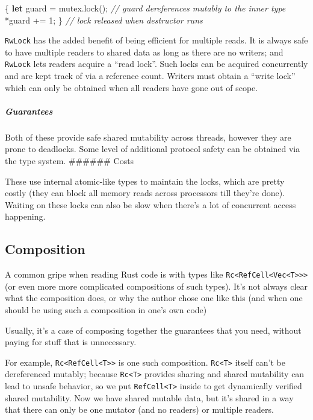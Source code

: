 \documentclass[a4paper,]{book}
\newenvironment{Shaded}{\begin{snugshade}}{\end{snugshade}}
\newcommand{\KeywordTok}[1]{\textcolor[rgb]{0.13,0.29,0.53}{\textbf{{#1}}}}
\newcommand{\DecValTok}[1]{\textcolor[rgb]{0.00,0.00,0.81}{{#1}}}
\newcommand{\CommentTok}[1]{\textcolor[rgb]{0.56,0.35,0.01}{\textit{{#1}}}}
\newcommand{\NormalTok}[1]{{#1}}
\let\oldsubparagraph\subparagraph
\renewcommand{\subparagraph}[1]{\oldsubparagraph{#1}\mbox{}}
\begin{document}
\begin{Shaded}
\begin{Highlighting}[]
\NormalTok{\{}
    \KeywordTok{let} \NormalTok{guard = mutex.lock();}
    \CommentTok{// guard dereferences mutably to the inner type}
    \NormalTok{*guard += }\DecValTok{1}\NormalTok{;}
\NormalTok{\} }\CommentTok{// lock released when destructor runs}
\end{Highlighting}
\end{Shaded}

\texttt{RwLock} has the added benefit of being efficient for multiple
reads. It is always safe to have multiple readers to shared data as long
as there are no writers; and \texttt{RwLock} lets readers acquire a
``read lock''. Such locks can be acquired concurrently and are kept
track of via a reference count. Writers must obtain a ``write lock''
which can only be obtained when all readers have gone out of scope.

\subparagraph{Guarantees}\label{guarantees-4}

Both of these provide safe shared mutability across threads, however
they are prone to deadlocks. Some level of additional protocol safety
can be obtained via the type system. \#\#\#\#\#\# Costs

These use internal atomic-like types to maintain the locks, which are
pretty costly (they can block all memory reads across processors till
they're done). Waiting on these locks can also be slow when there's a
lot of concurrent access happening.

\subsection{Composition}\label{composition}

A common gripe when reading Rust code is with types like
\texttt{Rc\textless{}RefCell\textless{}Vec\textless{}T\textgreater{}\textgreater{}\textgreater{}}
(or even more more complicated compositions of such types). It's not
always clear what the composition does, or why the author chose one like
this (and when one should be using such a composition in one's own code)

Usually, it's a case of composing together the guarantees that you need,
without paying for stuff that is unnecessary.

For example,
\texttt{Rc\textless{}RefCell\textless{}T\textgreater{}\textgreater{}} is
one such composition. \texttt{Rc\textless{}T\textgreater{}} itself can't
be dereferenced mutably; because \texttt{Rc\textless{}T\textgreater{}}
provides sharing and shared mutability can lead to unsafe behavior, so
we put \texttt{RefCell\textless{}T\textgreater{}} inside to get
dynamically verified shared mutability. Now we have shared mutable data,
but it's shared in a way that there can only be one mutator (and no
readers) or multiple readers.
\end{document}

